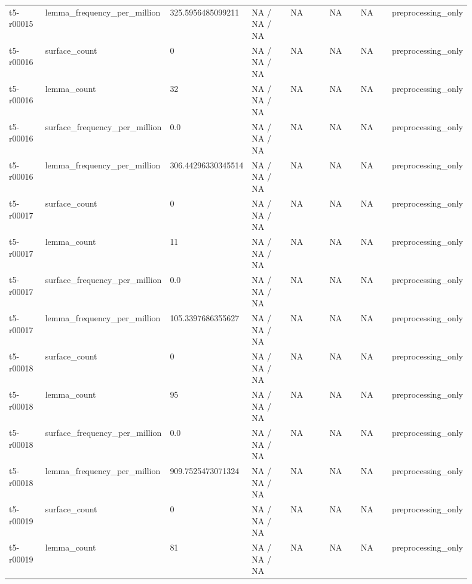 \begin{longtable}{@{}p{0.09\linewidth}p{0.14\linewidth}p{0.08\linewidth}p{0.14\linewidth}p{0.14\linewidth}p{0.1\linewidth}p{0.1\linewidth}p{0.11\linewidth}@{}}
t5-r00015 & lemma\_\allowbreak{}frequency\_\allowbreak{}per\_\allowbreak{}million & 325.5956485099211 & NA / NA / NA & NA & NA & NA & preprocessing\_\allowbreak{}only \\
t5-r00016 & surface\_\allowbreak{}count & 0 & NA / NA / NA & NA & NA & NA & preprocessing\_\allowbreak{}only \\
t5-r00016 & lemma\_\allowbreak{}count & 32 & NA / NA / NA & NA & NA & NA & preprocessing\_\allowbreak{}only \\
t5-r00016 & surface\_\allowbreak{}frequency\_\allowbreak{}per\_\allowbreak{}million & 0.0 & NA / NA / NA & NA & NA & NA & preprocessing\_\allowbreak{}only \\
t5-r00016 & lemma\_\allowbreak{}frequency\_\allowbreak{}per\_\allowbreak{}million & 306.44296330345514 & NA / NA / NA & NA & NA & NA & preprocessing\_\allowbreak{}only \\
t5-r00017 & surface\_\allowbreak{}count & 0 & NA / NA / NA & NA & NA & NA & preprocessing\_\allowbreak{}only \\
t5-r00017 & lemma\_\allowbreak{}count & 11 & NA / NA / NA & NA & NA & NA & preprocessing\_\allowbreak{}only \\
t5-r00017 & surface\_\allowbreak{}frequency\_\allowbreak{}per\_\allowbreak{}million & 0.0 & NA / NA / NA & NA & NA & NA & preprocessing\_\allowbreak{}only \\
t5-r00017 & lemma\_\allowbreak{}frequency\_\allowbreak{}per\_\allowbreak{}million & 105.3397686355627 & NA / NA / NA & NA & NA & NA & preprocessing\_\allowbreak{}only \\
t5-r00018 & surface\_\allowbreak{}count & 0 & NA / NA / NA & NA & NA & NA & preprocessing\_\allowbreak{}only \\
t5-r00018 & lemma\_\allowbreak{}count & 95 & NA / NA / NA & NA & NA & NA & preprocessing\_\allowbreak{}only \\
t5-r00018 & surface\_\allowbreak{}frequency\_\allowbreak{}per\_\allowbreak{}million & 0.0 & NA / NA / NA & NA & NA & NA & preprocessing\_\allowbreak{}only \\
t5-r00018 & lemma\_\allowbreak{}frequency\_\allowbreak{}per\_\allowbreak{}million & 909.7525473071324 & NA / NA / NA & NA & NA & NA & preprocessing\_\allowbreak{}only \\
t5-r00019 & surface\_\allowbreak{}count & 0 & NA / NA / NA & NA & NA & NA & preprocessing\_\allowbreak{}only \\
t5-r00019 & lemma\_\allowbreak{}count & 81 & NA / NA / NA & NA & NA & NA & preprocessing\_\allowbreak{}only \\

\end{longtable}
